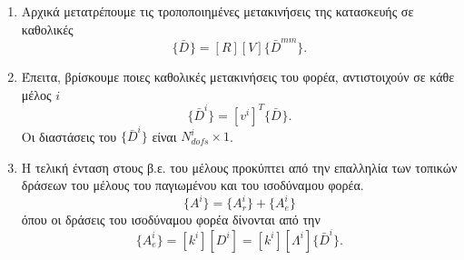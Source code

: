 \documentclass[a4paper, twocolumn]{article}
\newcommand{\num}[1]{ N_{\mathit{#1}} }
\newcommand{\vect}[1]{ \{ #1\} }
\newcommand{\mat}[1]{\left[ #1 \right]}
\newcommand{\lstiff}[1]{\mat{k^{\mathit{#1}}}}
\newcommand{\gdisp}[1]{\vect{\bar{D}^{\mathit{#1}}}}
\begin{document}
\begin{enumerate}
	\item Αρχικά μετατρέπουμε τις τροποποιημένες μετακινήσεις της 
	κατασκευής σε καθολικές
	\begin{equation}
		\gdisp{} =\mat{R} \mat{V} \gdisp{mm}.
	\end{equation}
		
	\item Έπειτα, βρίσκουμε ποιες καθολικές μετακινήσεις του φορέα, 
	αντιστοιχούν σε κάθε μέλος $i$
	\begin{equation}
		\gdisp{i} = \mat{v^i}^T \gdisp{}.
	\end{equation}
	Οι διαστάσεις του $\gdisp{i}$ είναι $\num{dofs}^i \times 1$.
	
	\item Η τελική ένταση στους β.ε. του μέλους προκύπτει από την 
	επαλληλία των τοπικών δράσεων του μέλους του παγιωμένου και του 
	ισοδύναμου φορέα.
	\begin{equation}
		\vect{A^i} = \vect{A^i_r} + \vect{A^i_e}
	\end{equation}
	όπου οι δράσεις του ισοδύναμου φορέα δίνονται από την
	\begin{equation}
		\vect{A^i_e} = \lstiff{i} \mat{D^i}
		= \lstiff{i} \mat{\Lambda^i} \gdisp{i}.
	\end{equation}
\end{enumerate}
\end{document}
